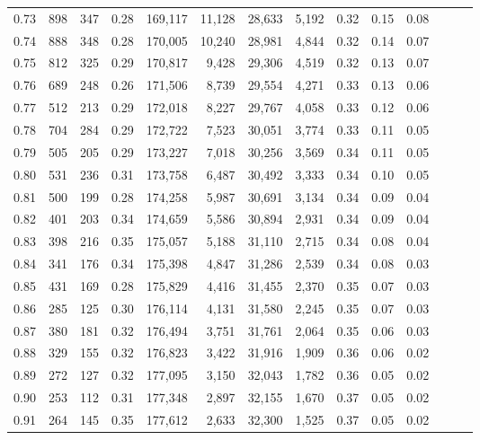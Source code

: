 \begin{tabular}{rrrrrrrrrrrrrr}
0.73 &    898 &  347 &  0.28 &  169,117 &   11,128 &  28,633 &   5,192 &  0.32 &  0.15 &      0.08 \\
0.74 &    888 &  348 &  0.28 &  170,005 &   10,240 &  28,981 &   4,844 &  0.32 &  0.14 &      0.07 \\
0.75 &    812 &  325 &  0.29 &  170,817 &    9,428 &  29,306 &   4,519 &  0.32 &  0.13 &      0.07 \\
0.76 &    689 &  248 &  0.26 &  171,506 &    8,739 &  29,554 &   4,271 &  0.33 &  0.13 &      0.06 \\
0.77 &    512 &  213 &  0.29 &  172,018 &    8,227 &  29,767 &   4,058 &  0.33 &  0.12 &      0.06 \\
0.78 &    704 &  284 &  0.29 &  172,722 &    7,523 &  30,051 &   3,774 &  0.33 &  0.11 &      0.05 \\
0.79 &    505 &  205 &  0.29 &  173,227 &    7,018 &  30,256 &   3,569 &  0.34 &  0.11 &      0.05 \\
0.80 &    531 &  236 &  0.31 &  173,758 &    6,487 &  30,492 &   3,333 &  0.34 &  0.10 &      0.05 \\
0.81 &    500 &  199 &  0.28 &  174,258 &    5,987 &  30,691 &   3,134 &  0.34 &  0.09 &      0.04 \\
0.82 &    401 &  203 &  0.34 &  174,659 &    5,586 &  30,894 &   2,931 &  0.34 &  0.09 &      0.04 \\
0.83 &    398 &  216 &  0.35 &  175,057 &    5,188 &  31,110 &   2,715 &  0.34 &  0.08 &      0.04 \\
0.84 &    341 &  176 &  0.34 &  175,398 &    4,847 &  31,286 &   2,539 &  0.34 &  0.08 &      0.03 \\
0.85 &    431 &  169 &  0.28 &  175,829 &    4,416 &  31,455 &   2,370 &  0.35 &  0.07 &      0.03 \\
0.86 &    285 &  125 &  0.30 &  176,114 &    4,131 &  31,580 &   2,245 &  0.35 &  0.07 &      0.03 \\
0.87 &    380 &  181 &  0.32 &  176,494 &    3,751 &  31,761 &   2,064 &  0.35 &  0.06 &      0.03 \\
0.88 &    329 &  155 &  0.32 &  176,823 &    3,422 &  31,916 &   1,909 &  0.36 &  0.06 &      0.02 \\
0.89 &    272 &  127 &  0.32 &  177,095 &    3,150 &  32,043 &   1,782 &  0.36 &  0.05 &      0.02 \\
0.90 &    253 &  112 &  0.31 &  177,348 &    2,897 &  32,155 &   1,670 &  0.37 &  0.05 &      0.02 \\
0.91 &    264 &  145 &  0.35 &  177,612 &    2,633 &  32,300 &   1,525 &  0.37 &  0.05 &      0.02 \\

\end{tabular}
